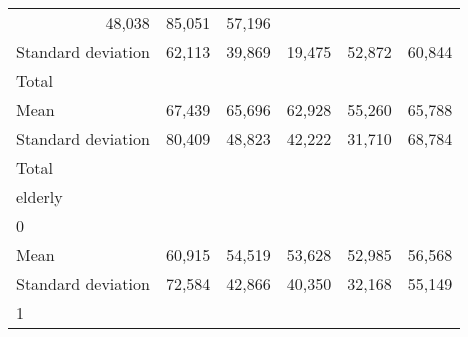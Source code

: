 \begin{tabular}{llllll}
  \multicolumn{1}{r}{48,038} &
  \multicolumn{1}{r}{85,051} &
  \multicolumn{1}{r}{57,196} \\
\multicolumn{1}{l}{\hspace{4em}Standard deviation} &
  \multicolumn{1}{|r}{62,113} &
  \multicolumn{1}{r}{39,869} &
  \multicolumn{1}{r}{19,475} &
  \multicolumn{1}{r}{52,872} &
  \multicolumn{1}{r}{60,844} \\
\multicolumn{1}{l}{\hspace{3em}Total} &
  \multicolumn{1}{|r}{} &
  \multicolumn{1}{r}{} &
  \multicolumn{1}{r}{} &
  \multicolumn{1}{r}{} &
  \multicolumn{1}{r}{} \\
\multicolumn{1}{l}{\hspace{4em}Mean} &
  \multicolumn{1}{|r}{67,439} &
  \multicolumn{1}{r}{65,696} &
  \multicolumn{1}{r}{62,928} &
  \multicolumn{1}{r}{55,260} &
  \multicolumn{1}{r}{65,788} \\
\multicolumn{1}{l}{\hspace{4em}Standard deviation} &
  \multicolumn{1}{|r}{80,409} &
  \multicolumn{1}{r}{48,823} &
  \multicolumn{1}{r}{42,222} &
  \multicolumn{1}{r}{31,710} &
  \multicolumn{1}{r}{68,784} \\
\multicolumn{1}{l}{\hspace{1em}Total} &
  \multicolumn{1}{|r}{} &
  \multicolumn{1}{r}{} &
  \multicolumn{1}{r}{} &
  \multicolumn{1}{r}{} &
  \multicolumn{1}{r}{} \\
\multicolumn{1}{l}{\hspace{2em}elderly} &
  \multicolumn{1}{|r}{} &
  \multicolumn{1}{r}{} &
  \multicolumn{1}{r}{} &
  \multicolumn{1}{r}{} &
  \multicolumn{1}{r}{} \\
\multicolumn{1}{l}{\hspace{3em}0} &
  \multicolumn{1}{|r}{} &
  \multicolumn{1}{r}{} &
  \multicolumn{1}{r}{} &
  \multicolumn{1}{r}{} &
  \multicolumn{1}{r}{} \\
\multicolumn{1}{l}{\hspace{4em}Mean} &
  \multicolumn{1}{|r}{60,915} &
  \multicolumn{1}{r}{54,519} &
  \multicolumn{1}{r}{53,628} &
  \multicolumn{1}{r}{52,985} &
  \multicolumn{1}{r}{56,568} \\
\multicolumn{1}{l}{\hspace{4em}Standard deviation} &
  \multicolumn{1}{|r}{72,584} &
  \multicolumn{1}{r}{42,866} &
  \multicolumn{1}{r}{40,350} &
  \multicolumn{1}{r}{32,168} &
  \multicolumn{1}{r}{55,149} \\
\multicolumn{1}{l}{\hspace{3em}1} &

\end{tabular}

